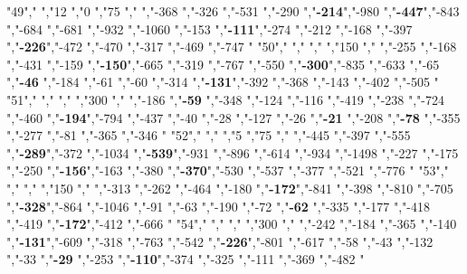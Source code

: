 "49","        ","12   ","0   ","75  ","     ","-368          ","-326          ","-531          ","-290          ","\textbf{-214}","-980          ","\textbf{-447}","-843          ","-684          ","-681          ","-932          ","-1060         ","-153          ","\textbf{-111}","-274          ","-212          ","-168          ","-397          ","\textbf{-226}","-472          ","-470          ","-317          ","-469          ","-747          "
"50","        ","     ","    ","150 ","     ","-255          ","-168          ","-431          ","-159          ","\textbf{-150}","-665          ","-319          ","-767          ","-550          ","\textbf{-300}","-835          ","-633          ","-65           ","\textbf{-46} ","-184          ","-61           ","-60           ","-314          ","\textbf{-131}","-392          ","-368          ","-143          ","-402          ","-505          "
"51","        ","     ","    ","300 ","     ","-186          ","\textbf{-59} ","-348          ","-124          ","-116          ","-419          ","-238          ","-724          ","-460          ","\textbf{-194}","-794          ","-437          ","-40           ","-28           ","-127          ","-26           ","\textbf{-21} ","-208          ","\textbf{-78} ","-355          ","-277          ","-81           ","-365          ","-346          "
"52","        ","     ","5   ","75  ","     ","-445          ","-397          ","-555          ","\textbf{-289}","-372          ","-1034         ","\textbf{-539}","-931          ","-896          ","-614          ","-934          ","-1498         ","-227          ","-175          ","-250          ","\textbf{-156}","-163          ","-380          ","\textbf{-370}","-530          ","-537          ","-377          ","-521          ","-776          "
"53","        ","     ","    ","150 ","     ","-313          ","-262          ","-464          ","-180          ","\textbf{-172}","-841          ","-398          ","-810          ","-705          ","\textbf{-328}","-864          ","-1046         ","-91           ","-63           ","-190          ","-72           ","\textbf{-62} ","-335          ","-177          ","-418          ","-419          ","\textbf{-172}","-412          ","-666          "
"54","        ","     ","    ","300 ","     ","-242          ","-184          ","-365          ","-140          ","\textbf{-131}","-609          ","-318          ","-763          ","-542          ","\textbf{-226}","-801          ","-617          ","-58           ","-43           ","-132          ","-33           ","\textbf{-29} ","-253          ","\textbf{-110}","-374          ","-325          ","-111          ","-369          ","-482          "
